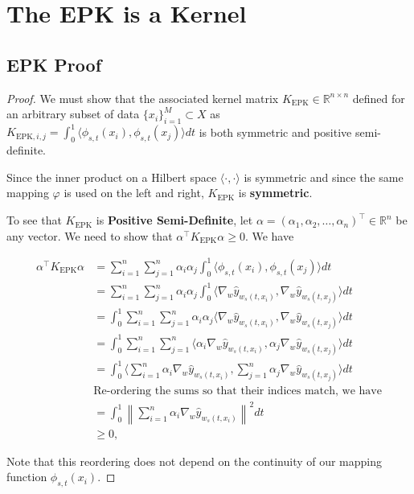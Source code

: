 \chapter{The EPK is a Kernel}

\section{EPK Proof}
\ker*
\begin{proof}
We must show that the associated kernel matrix $K_{\text{EPK}} \in \mathbb{R}^{n\times n}$ defined for an arbitrary subset of data $\{x_i\}_{i=1}^M \subset X$ as $K_{\text{EPK},i,j} = \int_0^1\langle \phi_{s,t}(x_i), \phi_{s,t}(x_j)\rangle dt$ is both symmetric and positive semi-definite.

Since the inner product on a Hilbert space $\langle \cdot, \cdot \rangle$ is symmetric and since the same mapping $\varphi$ is used on the left and right, $K_{\text{EPK}}$ is \textbf{symmetric}. 

To see that $K_{\text{EPK}}$ is \textbf{Positive Semi-Definite}, let $\alpha = (\alpha_1, \alpha_2, \dots, \alpha_n)^\top \in \mathbb{R}^n$ be any vector. We need to show that $\alpha^\top K_{\text{EPK}} \alpha \geq 0$. We have

\begin{align}
\alpha^\top K_{\text{EPK}} \alpha &= \sum_{i=1}^n \sum_{j=1}^n \alpha_i \alpha_j \int_0^1 \langle \phi_{s,t}(x_i), \phi_{s,t}(x_j)\rangle dt \\
&= \sum_{i=1}^n \sum_{j=1}^n \alpha_i \alpha_j \int_0^1 \langle \nabla_{w}\hat{y}_{w_s(t,x_i)}, \nabla_{w}\hat{y}_{w_s(t,x_j)}\rangle dt \\
&= \int_0^1 \sum_{i=1}^n \sum_{j=1}^n \alpha_i \alpha_j \langle \nabla_{w}\hat{y}_{w_s(t,x_i)}, \nabla_{w}\hat{y}_{w_s(t,x_j)}\rangle dt \\
&= \int_0^1 \sum_{i=1}^n \sum_{j=1}^n  \langle \alpha_i \nabla_{w}\hat{y}_{w_s(t,x_i)}, \alpha_j \nabla_{w}\hat{y}_{w_s(t,x_j)}\rangle dt \\
&= \int_0^1    \langle \sum_{i=1}^n \alpha_i \nabla_{w}\hat{y}_{w_s(t,x_i)}, \sum_{j=1}^n \alpha_j \nabla_{w}\hat{y}_{w_s(t,x_j)}\rangle dt \\
& \text{Re-ordering the sums so that their indices match, we have}\\
&= \int_0^1 \left\lVert \sum_{i=1}^n \alpha_i \nabla_{w}\hat{y}_{w_s(t,x_i)}\right\rVert^2 dt \\
&\geq 0,
\end{align}

Note that this reordering does not depend on the continuity of our mapping function $\phi_{s,t}(x_i)$.

\end{proof}

